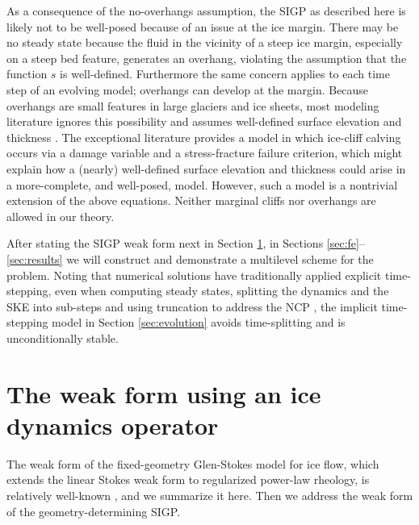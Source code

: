 \documentclass[letterpaper,final,12pt,reqno]{amsart}
\theoremstyle{claim}
\numberwithin{equation}{section}
\numberwithin{figure}{section}
\numberwithin{table}{section}
\numberwithin{theorem}{section}
\begin{document}
As a consequence of the no-overhangs assumption, the SIGP as described here is likely not to be well-posed because of an issue at the ice margin.  There may be no steady state because the fluid in the vicinity of a steep ice margin, especially on a steep bed feature, generates an overhang, violating the assumption that the function $s$ is well-defined.  Furthermore the same concern applies to each time step of an evolving model; overhangs can develop at the margin.  Because overhangs are small features in large glaciers and ice sheets, most modeling literature ignores this possibility and assumes well-defined surface elevation and thickness \cite{Jouvetetal2008,Lengetal2012,WirbelJarosch2020}.  The exceptional literature \cite{Jouvetetal2011,PralongFunk2005} provides a model in which ice-cliff calving occurs via a damage variable and a stress-fracture failure criterion, which might explain how a (nearly) well-defined surface elevation and thickness could arise in a more-complete, and well-posed, model.  However, such a model is a nontrivial extension of the above equations.  Neither marginal cliffs nor overhangs are allowed in our theory.

After stating the SIGP weak form next in Section \ref{sec:weakido}, in Sections \ref{sec:fe}--\ref{sec:results} we will construct and demonstrate a multilevel scheme for the problem.  Noting that numerical solutions have traditionally applied explicit time-stepping, even when computing steady states, splitting the dynamics and the SKE into sub-steps and using truncation to address the NCP \cite[for example]{Jouvetetal2008,Lengetal2012}, the implicit time-stepping model in Section \ref{sec:evolution} avoids time-splitting and is unconditionally stable.


\section{The weak form using an ice dynamics operator} \label{sec:weakido}

The weak form of the fixed-geometry Glen-Stokes model for ice flow, which extends the linear Stokes weak form \cite{Elmanetal2014} to regularized power-law rheology, is relatively well-known \cite{IsaacStadlerGhattas2015,JouvetRappaz2011,Lengetal2012}, and we summarize it here.  Then we address the weak form of the geometry-determining SIGP.
\end{document}
